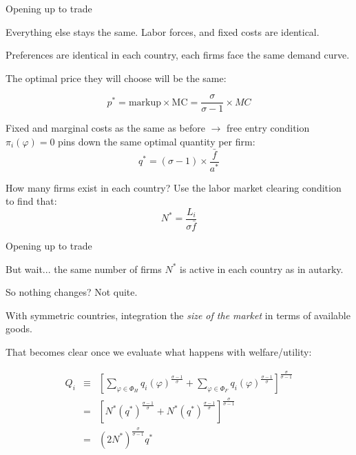 \documentclass[notes,11pt, aspectratio=169, xcolor=table]{beamer}
\newenvironment{wideitemize}{\itemize\addtolength{\itemsep}{10pt}}{\enditemize}
\begin{document}
\begin{frame}{Opening up to trade}
\begin{wideitemize}
    \item Everything else stays the same. Labor forces, and fixed costs are identical.
    
    \item Preferences are identical in each country, each firms face the same demand curve.
    
    \item<2-> The optimal price they will choose will be the same:

    \begin{equation*}
        p^* = \text{markup} \times \text{MC} = \frac{\sigma}{\sigma-1} \times MC
    \end{equation*}

    \item<3-> Fixed and marginal costs as the same as before $\rightarrow$ free entry condition $\pi_i(\varphi) =0$ pins down the same optimal quantity per firm:
    \begin{equation*}
        q^* = (\sigma-1) \times \frac{\bar{f}}{a^*}
    \end{equation*}

    \item<4-> How many firms exist in each country? Use the labor market clearing condition to find that:
    \begin{equation*}
        N^* = \frac{L_i}{\sigma \bar{f}}
    \end{equation*}
    

\end{wideitemize}
\end{frame}


\begin{frame}{Opening up to trade}
\begin{wideitemize}
    \item But wait... the same number of firms $N^*$ is active in each country as in autarky.
    
    \item<2-> So nothing changes? Not quite.

    \item<3-> With symmetric countries, integration the \emph{size of the market} in terms of available goods.
    
    \item<4-> That becomes clear once we evaluate what happens with welfare/utility:

\begin{eqnarray*}
         Q_i &\equiv& \left[ \sum_{\varphi \in \Phi_H } q_i(
    \varphi)^{\tfrac{\sigma-1}{\sigma}} +\sum_{\varphi \in \Phi_F } q_i(
    \varphi)^{\tfrac{\sigma-1}{\sigma}} \right]^{\tfrac{\sigma}{\sigma-1} } \\
    &=& \left[ N^* (q^*)^{\tfrac{\sigma-1}{\sigma}} +N^* (q^*)^{\tfrac{\sigma-1}{\sigma}} \right]^{\tfrac{\sigma}{\sigma-1} }\\
    &=& (2 N^*)^{\frac{\sigma}{\sigma-1}} q^*
\end{eqnarray*}

\end{wideitemize}
\end{frame}
\end{document}
